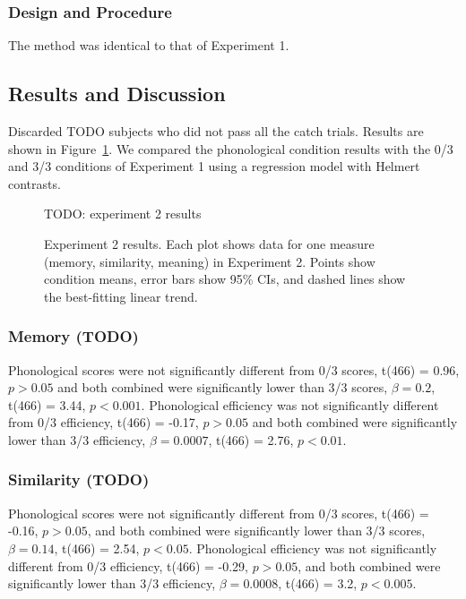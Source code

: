 \documentclass[man,floatsintext]{apa6}
\begin{document}
\subsubsection{Design and Procedure} The method was identical to that of Experiment 1.

\subsection{Results and Discussion}

Discarded TODO subjects who did not pass all the catch trials. Results are shown in Figure~\ref{expt2-results}. We compared the phonological condition results with the 0/3 and 3/3 conditions of Experiment 1 using a regression model with Helmert contrasts.%

\begin{figure}[t]
  \label{expt2-results}
  \caption{Experiment 2 results. Each plot shows data for one measure (memory, similarity, meaning) in Experiment 2. Points show condition means, error bars show 95\% CIs, and dashed lines show the best-fitting linear trend.}
  \begin{center}
    TODO: experiment 2 results
  \end{center}
\end{figure}

\subsubsection{Memory (TODO)}
Phonological scores were not significantly different from 0/3 scores, t(466) = 0.96, $p > 0.05$ and both combined were significantly lower than 3/3 scores, $\beta = 0.2$, t(466) = 3.44, $p < 0.001$. Phonological efficiency was not significantly different from 0/3 efficiency, t(466) = -0.17, $p > 0.05$ and both combined were significantly lower than 3/3 efficiency, $\beta = 0.0007$, t(466) = 2.76, $p < 0.01$.

\subsubsection{Similarity (TODO)}
Phonological scores were not significantly different from 0/3 scores, t(466) = -0.16, $p > 0.05$, and both combined were significantly lower than 3/3 scores, $\beta = 0.14$, t(466) = 2.54, $p < 0.05$. Phonological efficiency was not significantly different from 0/3 efficiency, t(466) = -0.29, $p > 0.05$, and both combined were significantly lower than 3/3 efficiency, $\beta = 0.0008$, t(466) = 3.2, $p < 0.005$.
\end{document}
